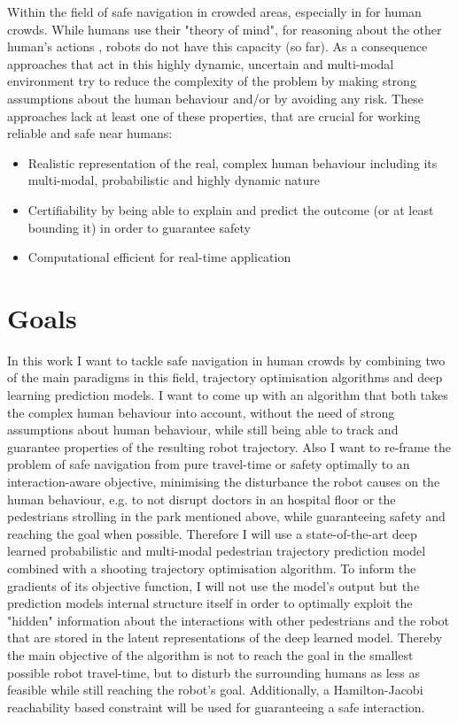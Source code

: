 Within the field of safe navigation in crowded areas, especially in for human crowds. While humans use their "theory of mind", for reasoning about the other human's actions \cite{Gweon2013}, robots do not have this capacity (so far). As a consequence approaches that act in this highly dynamic, uncertain and multi-modal environment try to reduce the complexity of the problem by making strong assumptions about the human behaviour and/or by avoiding any risk. These approaches lack at least one of these properties, that are crucial for working reliable and safe near humans: 

\begin{itemize}
\item Realistic representation of the real, complex human behaviour including its multi-modal, probabilistic and highly dynamic nature
\item Certifiability by being able to explain and predict the outcome (or at least bounding it) in order to guarantee safety 
\item Computational efficient for real-time application
\end{itemize}

\section{Goals}
\label{text:introduction/goals}
In this work I want to tackle safe navigation in human crowds by combining two of the main paradigms in this field, trajectory optimisation algorithms and deep learning prediction models. I want to come up with an algorithm that both takes the complex human behaviour into account, without the need of strong assumptions about human behaviour, while still being able to track and guarantee properties of the resulting robot trajectory. Also I want to re-frame the problem of safe navigation from pure travel-time or safety optimally to an interaction-aware objective, minimising the disturbance the robot causes on the human behaviour, e.g. to not disrupt doctors in an hospital floor or the pedestrians strolling in the park mentioned above, while guaranteeing safety and reaching the goal when possible.
\newline
Therefore I will use a state-of-the-art deep learned probabilistic and multi-modal pedestrian trajectory prediction model combined with a shooting trajectory optimisation algorithm. To inform the gradients of its objective function, I will not use the model's output but the prediction models internal structure itself in order to optimally exploit the "hidden" information about the interactions with other pedestrians and the robot that are stored in the latent representations of the deep learned model. Thereby the main objective of the algorithm is not to reach the goal in the smallest possible robot travel-time, but to disturb the surrounding humans as less as feasible while still reaching the robot's goal. Additionally, a Hamilton-Jacobi reachability based constraint will be used for guaranteeing a safe interaction. 

